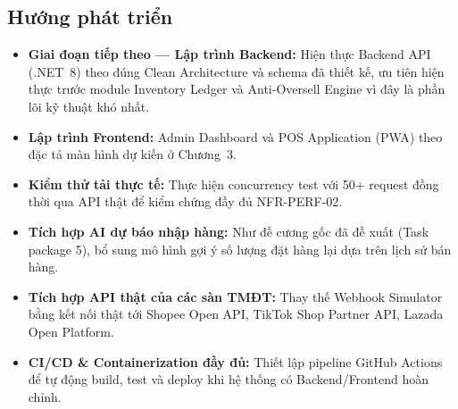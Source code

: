 \subsection{Hướng phát triển}
\begin{itemize}
    \item \textbf{Giai đoạn tiếp theo — Lập trình Backend:} Hiện thực Backend API (.NET~8) theo đúng Clean Architecture và schema đã thiết kế, ưu tiên hiện thực trước module Inventory Ledger và Anti-Oversell Engine vì đây là phần lõi kỹ thuật khó nhất.
    \item \textbf{Lập trình Frontend:} Admin Dashboard và POS Application (PWA) theo đặc tả màn hình dự kiến ở Chương~3.
    \item \textbf{Kiểm thử tải thực tế:} Thực hiện concurrency test với 50+ request đồng thời qua API thật để kiểm chứng đầy đủ NFR-PERF-02.
    \item \textbf{Tích hợp AI dự báo nhập hàng:} Như đề cương gốc đã đề xuất (Task package 5), bổ sung mô hình gợi ý số lượng đặt hàng lại dựa trên lịch sử bán hàng.
    \item \textbf{Tích hợp API thật của các sàn TMĐT:} Thay thế Webhook Simulator bằng kết nối thật tới Shopee Open API, TikTok Shop Partner API, Lazada Open Platform.
    \item \textbf{CI/CD \& Containerization đầy đủ:} Thiết lập pipeline GitHub Actions để tự động build, test và deploy khi hệ thống có Backend/Frontend hoàn chỉnh.
\end{itemize}
